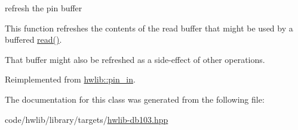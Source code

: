 refresh the pin buffer

This function refreshes the contents of the read buffer that might be used by a buffered \hyperlink{classdb103_1_1pin__in_aa45255f1a10bf9496f165e591d5cb329}{read()}.

That buffer might also be refreshed as a side-\/effect of other operations. 

Reimplemented from \hyperlink{classhwlib_1_1pin__in_a3fb1bfb1ec962bb6d31a5e865f0d0acb}{hwlib\+::pin\+\_\+in}.



The documentation for this class was generated from the following file\+:\begin{DoxyCompactItemize}
\item 
code/hwlib/library/targets/\hyperlink{hwlib-db103_8hpp}{hwlib-\/db103.\+hpp}\end{DoxyCompactItemize}

